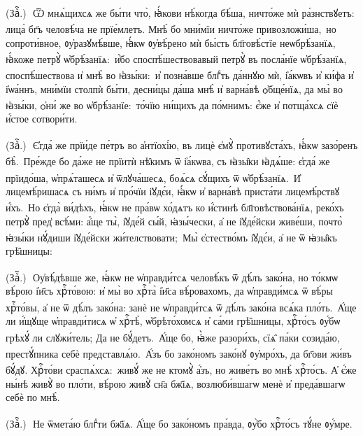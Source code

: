 (Заⷱ҇\:.)~\textsuperscript{}\,Ѿ мнѧ́щихсѧ же бы́ти что̀, ꙗ҆́кови нѣ́когда бѣ́ша, ничто́же мѝ ра́знствꙋетъ: лица̀ бг҃ъ человѣ́ча не прїе́млетъ. Мнѣ́ бо мни́мїи ничто́же привозложи́ша, \textsuperscript{}\,но сопроти́вное, ᲂу҆разꙋмѣ́вше, ꙗ҆́кѡ ᲂу҆вѣ́рено мѝ бы́сть бл҃говѣ́стїе неѡбрѣ́занїѧ, ꙗ҆́коже петрꙋ̀ ѡ҆брѣ́занїѧ: \textsuperscript{}\,и҆́бо споспѣ́шествовавый петрꙋ̀ въ посла́нїе ѡ҆брѣ́занїѧ, споспѣ́шествова и҆ мнѣ̀ во ꙗ҆зы́ки: \textsuperscript{}\,и҆ позна́вше блгⷣть да́ннꙋю мѝ, і҆а́кѡвъ и҆ ки́фа и҆ і҆ѡа́ннъ, мни́мїи столпѝ бы́ти, десни́цы да́ша мнѣ̀ и҆ варна́вѣ ѻ҆бще́нїѧ, да мы̀ во ꙗ҆зы́ки, ѻ҆ни́ же во ѡ҆брѣ́занїе: \textsuperscript{}\,то́чїю ни́щихъ да по́мнимъ: є҆́же и҆ потща́хсѧ сїѐ и҆́стое сотвори́ти.

(Заⷱ҇\:.)~\textsuperscript{}\,Є҆гда́ же прїи́де пе́тръ во а҆нтїохі́ю, въ лицѐ є҆мꙋ̀ противꙋста́хъ, ꙗ҆́кѡ зазо́ренъ бѣ̀. \textsuperscript{}\,Пре́жде бо да́же не прїитѝ нѣ̑кимъ ѿ і҆а́кѡва, съ ꙗ҆зы̑ки ꙗ҆дѧ́ше: є҆гда́ же прїидо́ша, ѡ҆прѧ́ташесѧ и҆ ѿлꙋча́шесѧ, боѧ́сѧ сꙋ́щихъ ѿ ѡ҆брѣ́занїѧ. \textsuperscript{}\,И҆ лицемѣ́ришасѧ съ ни́мъ и҆ про́чїи і҆ꙋдє́и, ꙗ҆́кѡ и҆ варна́вѣ приста́ти лицемѣ́рствꙋ и҆́хъ. \textsuperscript{}\,Но є҆гда̀ ви́дѣхъ, ꙗ҆́кѡ не пра́вѡ хо́дѧтъ ко и҆́стинѣ бл҃говѣствова́нїѧ, реко́хъ петрꙋ̀ пред̾ всѣ́ми: а҆́ще ты̀, і҆ꙋде́й сы́й, ꙗ҆зы́чески, а҆ не і҆ꙋде́йски живе́ши, почто̀ ꙗ҆зы́ки нꙋ́диши і҆ꙋде́йски жи́телствовати; \textsuperscript{}\,Мы̀ є҆стество́мъ і҆ꙋдє́и, а҆ не ѿ ꙗ҆зы̑къ грѣ̑шницы:

(Заⷱ҇\:.)~\textsuperscript{}\,Оу҆вѣ́дѣвше же, ꙗ҆́кѡ не ѡ҆правди́тсѧ человѣ́къ ѿ дѣ́лъ зако́на, но то́кмѡ вѣ́рою і҆и҃съ хрⷭ҇то́вою: и҆ мы̀ во хрⷭ҇та̀ і҆и҃са вѣ́ровахомъ, да ѡ҆правди́мсѧ ѿ вѣ́ры хрⷭ҇то́вы, а҆ не ѿ дѣ́лъ зако́на: занѐ не ѡ҆правди́тсѧ ѿ дѣ́лъ зако́на всѧ́ка пло́ть. \textsuperscript{}\,А҆́ще ли и҆́щꙋще ѡ҆правди́тисѧ ѡ҆ хрⷭ҇тѣ̀, ѡ҆брѣто́хомсѧ и҆ са́ми грѣ̑шницы, хрⷭ҇то́съ ᲂу҆́бѡ грѣхꙋ́ ли слꙋжи́тель; Да не бꙋ́детъ. \textsuperscript{}\,А҆́ще бо, ꙗ҆̀же разори́хъ, сїѧ̑ па́ки созида́ю, престꙋ́пника себѐ представлѧ́ю. \textsuperscript{}\,А҆́зъ бо зако́номъ зако́нꙋ ᲂу҆мро́хъ, да бг҃ови жи́въ бꙋ́дꙋ. Хрⷭ҇то́ви сраспѧ́хсѧ: \textsuperscript{}\,живꙋ́ же не ктомꙋ̀ а҆́зъ, но живе́тъ во мнѣ̀ хрⷭ҇то́съ. А҆ є҆́же ны́нѣ живꙋ̀ во пло́ти, вѣ́рою живꙋ̀ сн҃а бж҃їѧ, возлюби́вшагѡ менѐ и҆ преда́вшагѡ себѐ по мнѣ̀.

(Заⷱ҇\:.)~\textsuperscript{}\,Не ѿмета́ю блгⷣти бж҃їѧ. А҆́ще бо зако́номъ пра́вда, ᲂу҆̀бо хрⷭ҇то́съ тꙋ́не ᲂу҆́мре.

